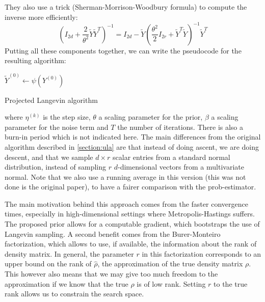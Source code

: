 \documentclass[12pt]{memoir}
\begin{document}
They also use a trick (Sherman-Morrison-Woodbury formula) to compute the inverse more efficiently:
\begin{equation}
\left( I_{2d} + \frac{2}{\theta^2} \tilde Y \tilde Y^{T} \right)^{-1} =  I_{2d} - \tilde Y \left( \frac{\theta^2}{2} I_{2r}+\tilde Y^{T} \tilde Y \right)^{-1} \tilde Y^{T}
\end{equation}
Putting all these components together, we can write the pseudocode for the resulting algorithm:\medbreak

\begin{algorithm}[H]
    \DontPrintSemicolon

    $\tilde Y^{(0)} \gets \psi(Y^{(0)})$\;
    \caption{Projected Langevin algorithm}
\end{algorithm}\medbreak
where $\eta^{(k)}$ is the step size, $\theta$ a scaling parameter for the prior, $\beta$ a scaling parameter for the noise term and $T$ the number of iterations. There is also a burn-in period which is not indicated here. The main differences from the original algorithm described in \ref{section:ula} are that instead of doing ascent, we are doing descent, and that we sample $ d\times r$ scalar entries from a standard normal distribution, instead of sampling $r$ $d$-dimensional vectors from a multivariate normal. Note that we also use a running average in this version (this was not done is the original paper), to have a fairer comparison with the prob-estimator.\medbreak

The main motivation behind this approach comes from the faster convergence times, especially in high-dimensional settings where Metropolis-Hastings suffers. The proposed prior allows for a computable gradient, which bootstraps the use of Langevin sampling. A second benefit comes from the Burer-Monteiro factorization, which allows to use, if available, the information about the rank of density matrix. In general, the parameter $r$ in this factorization corresponds to an upper bound on the rank of $\hat \rho$, the approximation of the true density matrix $\rho$. This however also means that we may give too much freedom to the approximation if we know that the true $\rho$ is of low rank. Setting $r$ to the true rank allows us to constrain the search space.\medbreak
\end{document}
